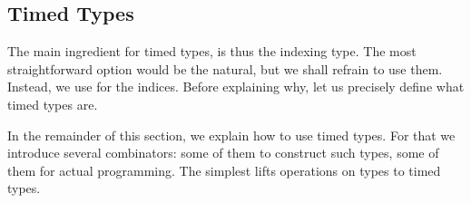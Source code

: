 \subsection{Timed Types}
The main ingredient for timed types, is thus the indexing type.
The most straightforward option would be the natural, but we shall refrain to use them.
Instead, we use  for the indices.
Before explaining why, let us precisely define what timed types are.

\begin{code}%
\>[0]\AgdaSpace{}%
\AgdaSymbol{=}\AgdaSpace{}%
\AgdaSpace{}%
\AgdaSpace{}%
\<%
\end{code}

In the remainder of this section, we explain how to use timed types.
For that we introduce several combinators: some of them to construct such types, some of them for actual programming.
The simplest lifts operations on types to timed types.

\begin{code}%
\>[0]\AgdaSpace{}%
\AgdaSymbol{:}\AgdaSpace{}%
\AgdaSpace{}%
\AgdaSpace{}%
\AgdaSpace{}%
\AgdaSpace{}%
\<%
\\
\>[0]\AgdaSymbol{(}\AgdaSpace{}%
\AgdaSpace{}%
\AgdaSymbol{)}\AgdaSpace{}%
\AgdaSpace{}%
\AgdaSymbol{=}\AgdaSpace{}%
\AgdaSpace{}%
\AgdaSpace{}%
\AgdaSpace{}%
\AgdaSpace{}%
\<%
\\
%
\\[\AgdaEmptyExtraSkip]%
\>[0]\AgdaSpace{}%
\AgdaSymbol{:}\AgdaSpace{}%
\AgdaSpace{}%
\AgdaSpace{}%
\AgdaSpace{}%
\AgdaSpace{}%
\<%
\\
\>[0]\AgdaSymbol{(}\AgdaSpace{}%
\AgdaSpace{}%
\AgdaSymbol{)}\AgdaSpace{}%
\AgdaSpace{}%
\AgdaSymbol{=}\AgdaSpace{}%
\AgdaSpace{}%
\AgdaSpace{}%
\AgdaSpace{}%
\AgdaSpace{}%
\<%
\\
%
\\[\AgdaEmptyExtraSkip]%
\>[0]\AgdaSpace{}%
\AgdaSymbol{:}\AgdaSpace{}%
\AgdaSpace{}%
\AgdaSpace{}%
\<%
\\
\>[0]\AgdaSpace{}%
\AgdaSpace{}%
\AgdaSpace{}%
\AgdaSymbol{=}\AgdaSpace{}%
\<%
\end{code}

